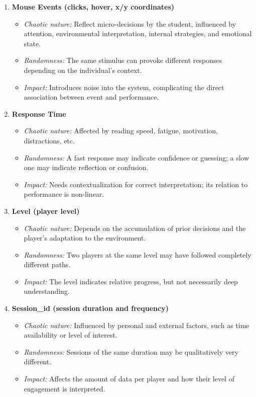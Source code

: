\documentclass{article}
\begin{document}
\begin{enumerate}
    \item \textbf{Mouse Events (clicks, hover, x/y coordinates)}
    \begin{itemize}
        \item \textit{Chaotic nature:} Reflect micro-decisions by the 
        student, influenced by attention, environmental interpretation, 
        internal strategies, and emotional state.
        \item \textit{Randomness:} The same stimulus can provoke different 
        responses depending on the individual's context.
        \item \textit{Impact:} Introduces noise into the system, 
        complicating the direct association between event and performance.
    \end{itemize}
    
    \item \textbf{Response Time}
    \begin{itemize}
        \item \textit{Chaotic nature:} Affected by reading speed, fatigue,
        motivation, distractions, etc.
        \item \textit{Randomness:} A fast response may indicate confidence 
        or guessing; a slow one may indicate reflection or confusion.
        \item \textit{Impact:} Needs contextualization for correct 
        interpretation; its relation to performance is non-linear.
    \end{itemize}
    
    \item \textbf{Level (player level)}
    \begin{itemize}
        \item \textit{Chaotic nature:} Depends on the accumulation of 
        prior decisions and the player's adaptation to the environment.
        \item \textit{Randomness:} Two players at the same level may have 
        followed completely different paths.
        \item \textit{Impact:} The level indicates relative progress, but 
        not necessarily deep understanding.
    \end{itemize}
    
    \item \textbf{Session\_id (session duration and frequency)}
    \begin{itemize}
        \item \textit{Chaotic nature:} Influenced by personal and external
        factors, such as time availability or level of interest.
        \item \textit{Randomness:} Sessions of the same duration may be 
        qualitatively very different.
        \item \textit{Impact:} Affects the amount of data per player and 
        how their level of engagement is interpreted.
    \end{itemize}
    

\end{enumerate}
\end{document}
